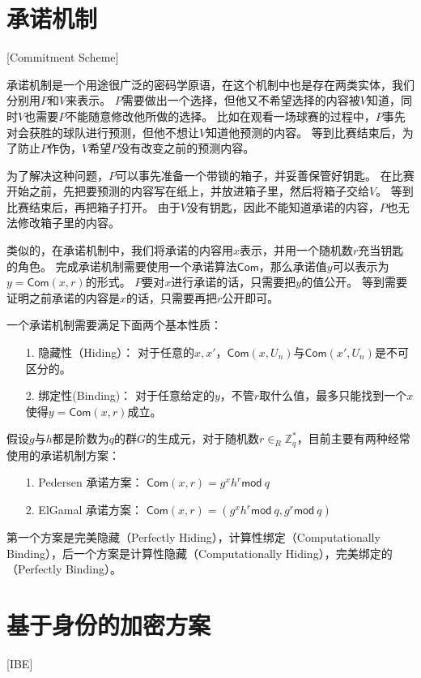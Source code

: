 \section{承诺机制}[Commitment Scheme]

承诺机制是一个用途很广泛的密码学原语，在这个机制中也是存在两类实体，我们分别用$P$和$V$来表示。
$P$需要做出一个选择，但他又不希望选择的内容被$V$知道，同时$V$也需要$P$不能随意修改他所做的选择。
比如在观看一场球赛的过程中，$P$事先对会获胜的球队进行预测，但他不想让$V$知道他预测的内容。
等到比赛结束后，为了防止$P$作伪，$V$希望$P$没有改变之前的预测内容。

为了解决这种问题，$P$可以事先准备一个带锁的箱子，并妥善保管好钥匙。
在比赛开始之前，先把要预测的内容写在纸上，并放进箱子里，然后将箱子交给$V$。
等到比赛结束后，再把箱子打开。
由于$V$没有钥匙，因此不能知道承诺的内容，$P$也无法修改箱子里的内容。

类似的，在承诺机制中，我们将承诺的内容用$x$表示，并用一个随机数$r$充当钥匙的角色。
完成承诺机制需要使用一个承诺算法$\mathsf{Com}$，那么承诺值$y$可以表示为$y=\mathsf{Com}(x,r)$的形式。
$P$要对$x$进行承诺的话，只需要把$y$的值公开。
等到需要证明之前承诺的内容是$x$的话，只需要再把$r$公开即可。

一个承诺机制需要满足下面两个基本性质：

\begin{itemize}
  \item[1.] 隐藏性（Hiding）： 对于任意的$x,x'$，$\mathsf{Com}(x,U_n)$与$\mathsf{Com}(x',U_n)$是不可区分的。
  \item[2.] 绑定性(Binding)： 对于任意给定的$y$，不管$r$取什么值，最多只能找到一个$x$使得$y=\mathsf{Com}(x,r)$成立。
\end{itemize}

假设$g$与$h$都是阶数为$q$的群$G$的生成元，对于随机数$r\in_R\mathbb{Z}_q^*$，目前主要有两种经常使用的承诺机制方案：

\begin{itemize}
  \item[1.] Pedersen 承诺方案： $\mathsf{Com}(x,r)=g^xh^r\mathsf{mod}\ q$
  \item[2.] ElGamal 承诺方案： $\mathsf{Com}(x,r)=(g^xh^r \mathsf{mod}\ q,g^r\mathsf{mod}\ q)$
\end{itemize}

第一个方案是完美隐藏（Perfectly Hiding），计算性绑定（Computationally Binding），后一个方案是计算性隐藏（Computationally Hiding），完美绑定的（Perfectly Binding）。

\section{基于身份的加密方案}[IBE]

